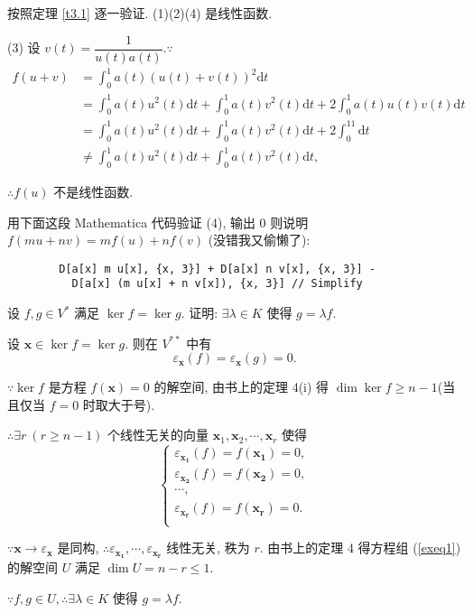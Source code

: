 \documentclass{ctexart}
\begin{document}
\begin{solution}
    按照定理 \ref{t3.1} 逐一验证. (1)(2)(4) 是线性函数.

    (3) 设 $v(t)=\dfrac{1}{u(t)a(t)}.\because$
    \begin{align*}
        f(u+v) & =\int_0^1a(t)(u(t)+v(t))^2\mathrm{d}t \\
        & =\int_0^1a(t)u^2(t)\mathrm{d}t+\int_0^1a(t)v^2(t)\mathrm{d}t+2\int_0^1a(t)u(t)v(t)\mathrm{d}t \\
        & =\int_0^1a(t)u^2(t)\mathrm{d}t+\int_0^1a(t)v^2(t)\mathrm{d}t+2\int_0^11\mathrm{d}t \\
        & \neq\int_0^1a(t)u^2(t)\mathrm{d}t+\int_0^1a(t)v^2(t)\mathrm{d}t,
    \end{align*}
    
    $\therefore f(u)$ 不是线性函数.
\end{solution}
\begin{note}
    用下面这段 Mathematica 代码验证 (4), 输出 $0$ 则说明 $f(mu+nv)=mf(u)+nf(v)$ (没错我又偷懒了):
    \begin{verbatim}
        D[a[x] m u[x], {x, 3}] + D[a[x] n v[x], {x, 3}] - 
          D[a[x] (m u[x] + n v[x]), {x, 3}] // Simplify
    \end{verbatim}
\end{note}
\begin{exercise}%
    设 $f,g\in V^*$ 满足 $\ker f=\ker g$. 证明: $\exists\lambda\in K$ 使得 $g=\lambda f$.
\end{exercise}
\begin{solution}
    设 $\boldsymbol{x}\in\ker f=\ker g$. 则在 $V^{**}$ 中有
    \[\varepsilon_{\boldsymbol{x}}(f)=\varepsilon_{\boldsymbol{x}}(g)=0.\]

    $\because\ker f$ 是方程 $f(\boldsymbol{x})=0$ 的解空间, 由书上的定理 4(i) 得 $\dim\ker f\geq n-1$(当且仅当 $f=0$ 时取大于号).

    $\therefore\exists r\ (r\geq n-1)$ 个线性无关的向量 $\boldsymbol{x}_1,\boldsymbol{x}_2,\cdots,\boldsymbol{x}_r$ 使得
    \begin{equation}\label{exeq1}
        \begin{cases}
            \varepsilon_{\boldsymbol{x_1}}(f)=f(\boldsymbol{x_1})=0, \\
            \varepsilon_{\boldsymbol{x_2}}(f)=f(\boldsymbol{x_2})=0, \\
            \cdots, \\
            \varepsilon_{\boldsymbol{x_r}}(f)=f(\boldsymbol{x_r})=0. \\
        \end{cases}
    \end{equation}

    $\because\boldsymbol{x}\to\varepsilon_{\boldsymbol{x}}$ 是同构, $\therefore\varepsilon_{\boldsymbol{x_1}},\cdots,\varepsilon_{\boldsymbol{x_r}}$ 线性无关, 秩为 $r$. 由书上的定理 4 得方程组 (\ref{exeq1}) 的解空间 $U$ 满足 $\dim U=n-r\leq 1$.

    $\because f,g\in U,\therefore\exists\lambda\in K$ 使得 $g=\lambda f$.
\end{solution}
\end{document}

